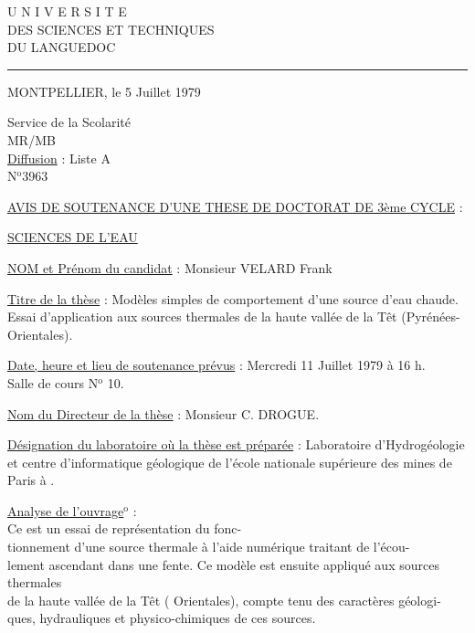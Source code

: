 

U N I V E R S I T E\\
DES SCIENCES ET TECHNIQUES\\
DU LANGUEDOC\\
\rule{3cm}{0.4pt}
\hfill MONTPELLIER, le 5 Juillet 1979

Service de la Scolarité\\
MR/MB\\
\uline{Diffusion} : Liste A\\
N$^{\mathrm{o}}$3963

\begin{center}
\uline{AVIS DE SOUTENANCE D'UNE THESE DE DOCTORAT DE 3ème CYCLE} :

\uline{SCIENCES DE L'EAU}
\end{center}

\uline{NOM et Prénom du candidat} : Monsieur VELARD Frank

\uline{Titre de la thèse} : Modèles simples de comportement d'une source d'eau chaude.\\
Essai d'application aux sources thermales de la haute vallée de la Têt (Pyrénées-\\
Orientales).

\uline{Date, heure et lieu de soutenance prévus} : Mercredi 11 Juillet 1979 à 16 h.\\
\hspace*{6cm}Salle de cours N$^{\mathrm{o}}$ 10.

\uline{Nom du Directeur de la thèse} : Monsieur C. DROGUE.

\uline{Désignation du laboratoire où la thèse est préparée} : Laboratoire d'Hydrogéologie\\
et centre d'informatique géologique de l'école nationale supérieure des mines de\\
Paris à .

\uline{Analyse de l'ouvrage}$^{\mathrm{o}}$ :\\
Ce  est un essai de représentation du fonc-\\
tionnement d'une source thermale à l'aide  numérique traitant de l'écou-\\
lement ascendant dans une fente. Ce modèle est ensuite appliqué aux sources thermales\\
de la haute vallée de la Têt ( Orientales), compte tenu des caractères géologi-\\
ques, hydrauliques et physico-chimiques de ces sources.


